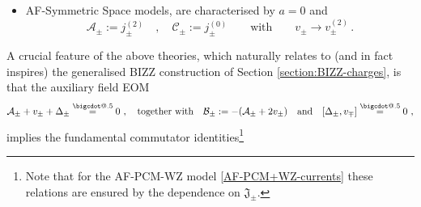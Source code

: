 \documentclass[12pt]{article}
\makeatletter
\newcommand*\bigcdot{\mathpalette\bigcdot@{.5}}
\newcommand*\bigcdot@[2]{\mathbin{\vcenter{\hbox{\scalebox{#2}{$\m@th#1\bullet$}}}}}
\newcommand{\deq}{\stackrel{\bigcdot}{=}}
\numberwithin{equation}{section}
\makeatother
\begin{document}
\begin{itemize}
{\begin{equation}
j_{\pm}+v_{\pm}+\Delta_{\pm}\deq 0 \,\, , 
\qquad \text{such that} \qquad j_{\pm}\neq \mathcal{A}_{\pm}\neq\tilde{\mathcal{A}}_{\pm}  \,\, .
\end{equation}
This difference comes from the fact that the WZ term is not modified by the auxiliary fields and hence the $v$-EOM must by construction agree with the one of the simpler AF-PCM. In the spirit of looking for a more general set of EOM, able to possibly encompass even more examples of AF-deformed sigma models, it is interesting to notice how the current $j_{\pm}$ appearing in the $v$-EOM could in fact be re-expressed as
\begin{equation}
j_{\pm}=(1\pm\tfrac{\kay}{\hay})^{-1}\Bigl(\tilde{\mathcal{A}}_{\pm}\pm \tfrac{\kay}{\hay} \tilde{\mathcal{B}}_{\pm} \Bigr)
\qquad \xrightarrow[\kay \rightarrow 0]
\qquad \qquad 
j_{\pm}=\tilde{\mathcal{A}}_{\pm}=\mathcal{A}_{\pm}\,\, ,
\end{equation}
a feature that one might interpret as more generally arising in the presence of a WZ term.
} are characterised by $a=1$, $\mathcal{C}_{\pm}:=0$ and
\begin{equation}\label{AF-PCM+WZ-currents}
\mathcal{A}_{\pm}:= (j_{\pm} \mp\tfrac{\kay}{\hay}\mathfrak{J}_{\pm})
\quad , \quad 
\mathcal{B}_{\pm}:= (\mathfrak{J}_{\pm} \mp\tfrac{\kay}{\hay}j_{\pm})
\qquad \text{with} \qquad 
\mathfrak{J}_{\pm}:=-(j_{\pm}+2v_{\pm}) \, .
\end{equation}
\item AF-Symmetric Space models, are characterised by $a=0$ and 
\begin{equation}
\mathcal{A}_{\pm}:=j_{\pm}^{(2)}
\quad , \quad 
\mathcal{C}_{\pm}:=j_{\pm}^{(0)} 
\qquad \text{with} \qquad
v_{\pm} \rightarrow v_{\pm}^{(2)} \, .
\end{equation}
\end{itemize}
A crucial feature of the above theories, which naturally relates to (and in fact inspires) the generalised BIZZ construction of Section \ref{section:BIZZ-charges}, is that the auxiliary field EOM 
\begin{equation}
\mathcal{A}_{\pm}+v_{\pm}+\Delta_{\pm}\deq 0 \,\, , 
\quad \text{together with}
\quad 
\mathcal{B}_{\pm}:=-(\mathcal{A}_{\pm}+2v_{\pm})
\quad \text{and} \quad
[\Delta_{\pm},v_{\mp}]\deq 0 \,\, ,
\end{equation}
implies the fundamental commutator identities\footnote{Note that for the AF-PCM-WZ model \eqref{AF-PCM+WZ-currents} these relations are ensured by the dependence on $\mathfrak{J}_{\pm}$.}
\end{document}
